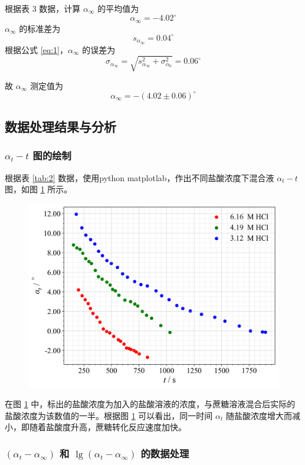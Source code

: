 根据表 3 数据，计算 $\alpha_{\infty}$ 的平均值为
$$
\alpha_{\infty} = -4.02^{\circ}
$$
$\alpha_{\infty}$ 的标准差为
$$
s_{\alpha_{\infty}} = 0.04^{\circ}
$$
根据公式 \eqref{eq:1}，$\alpha_{\infty}$ 的误差为
$$
\sigma_{\alpha_{\infty}} = \sqrt{s_{\alpha_{\infty}}^2+\sigma_{\alpha_0}^2}=0.06^{\circ}
$$

故 $\alpha_{\infty}$ 测定值为
$$
\alpha_{\infty} = −(4.02 \pm 0.06)^{\circ}
$$

\subsection{数据处理结果与分析}

\subsubsection{$\alpha_t-t$ 图的绘制}

根据表 \ref{tab:2} 数据，使用python matplotlab，作出不同盐酸浓度下混合液 $\alpha_t-t$ 图，如图 \ref{fig:1} 所示。

\begin{figure}[htbp]
    \centering
    \includegraphics[width=.8\textwidth]{figures/1.png}
    \label{fig:1}
\end{figure}

在图 \ref{fig:1} 中，标出的盐酸浓度为加入的盐酸溶液的浓度，与蔗糖溶液混合后实际的盐酸浓度为该数值的一半。根据图 \ref{fig:1} 可以看出，同一时间 $\alpha_t$ 随盐酸浓度增大而减小，即随着盐酸度升高，蔗糖转化反应速度加快。

\subsubsection{$\left(\alpha_t-\alpha_{\infty}\right)$ 和 $\lg \left(\alpha_t-\alpha_{\infty}\right)$ 的数据处理}

